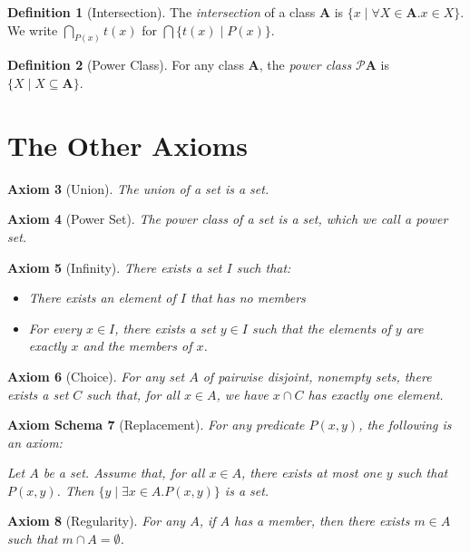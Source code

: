 \documentclass{book}
\newtheorem{ax}{Axiom}[section]
\newtheorem{axs}[ax]{Axiom Schema}
\theoremstyle{definition}
\newtheorem{df}[ax]{Definition}
\begin{document}
\begin{df}[Intersection]
The \emph{intersection} of a class $\mathbf{A}$ is $\{ x \mid \forall X \in \mathbf{A}. x \in X \}$. We write $\bigcap_{P(x)} t(x)$ for $\bigcap \{ t(x) \mid P(x) \}$.
\end{df}

\begin{df}[Power Class]
For any class $\mathbf{A}$, the \emph{power class} $\mathcal{P} \mathbf{A}$ is $\{ X \mid X \subseteq \mathbf{A} \}$.
\end{df}

\section{The Other Axioms}

\begin{ax}[Union]
The union of a set is a set.
\end{ax}

\begin{ax}[Power Set]
The power class of a set is a set, which we call a \emph{power set}.
\end{ax}

\begin{ax}[Infinity]
There exists a set $I$ such that:
\begin{itemize}
\item There exists an element of $I$ that has no members
\item For every $x \in I$, there exists a set $y \in I$ such that the elements of $y$ are exactly $x$ and the members of $x$.
\end{itemize}
\end{ax}

\begin{ax}[Choice]
For any set $A$ of pairwise disjoint, nonempty sets, there exists a set $C$ such that, for all $x \in A$, we have $x \cap C$ has exactly one element.
\end{ax}

\begin{axs}[Replacement]
For any predicate $P(x,y)$, the following is an axiom:

Let $A$ be a set. Assume that, for all $x \in A$, there exists at most one $y$ such that $P(x,y)$. Then $\{y \mid \exists x \in A. P(x,y)\}$ is a set.
\end{axs}

\begin{ax}[Regularity]
For any $A$, if $A$ has a member, then there exists $m \in A$ such that $m \cap A = \emptyset$.
\end{ax}
\end{document}
